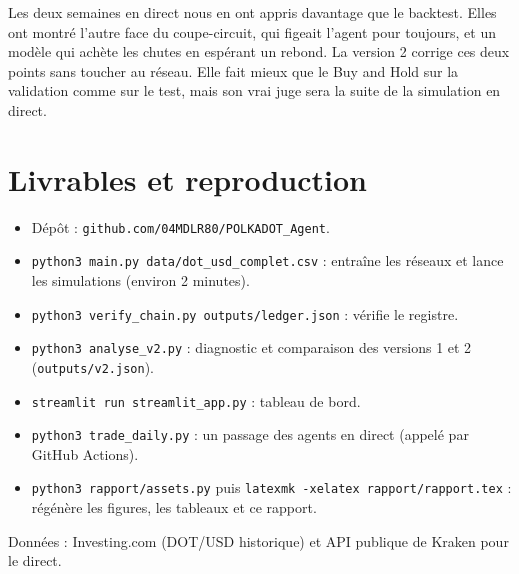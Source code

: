 \documentclass[11pt,a4paper]{article}
\begin{document}
Les deux semaines en direct nous en ont appris davantage que le backtest. Elles ont montré l'autre face du coupe-circuit, qui figeait l'agent pour toujours,
et un modèle qui achète les chutes en espérant un rebond. La version 2 corrige ces deux points sans toucher au réseau. Elle fait mieux que le Buy and Hold
sur la validation comme sur le test, mais son vrai juge sera la suite de la simulation en direct.

\appendix
\section{Livrables et reproduction}

\begin{itemize}
\item Dépôt : \texttt{github.com/04MDLR80/POLKADOT\_Agent}.
\item \texttt{python3 main.py data/dot\_usd\_complet.csv} : entraîne les réseaux et lance les simulations (environ 2 minutes).
\item \texttt{python3 verify\_chain.py outputs/ledger.json} : vérifie le registre.
\item \texttt{python3 analyse\_v2.py} : diagnostic et comparaison des versions 1 et 2 (\texttt{outputs/v2.json}).
\item \texttt{streamlit run streamlit\_app.py} : tableau de bord.
\item \texttt{python3 trade\_daily.py} : un passage des agents en direct (appelé par GitHub Actions).
\item \texttt{python3 rapport/assets.py} puis \texttt{latexmk -xelatex rapport/rapport.tex} : régénère les figures, les tableaux et ce rapport.
\end{itemize}

Données : Investing.com (DOT/USD historique) et API publique de Kraken pour le direct.
\end{document}
